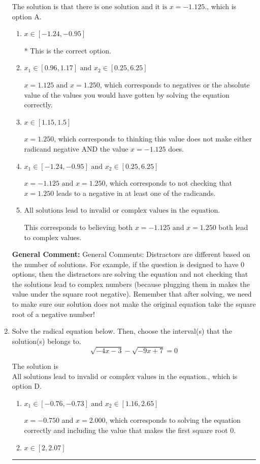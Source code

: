 \documentclass{extbook}[14pt]
\newcommand{\litem}[1]{\item #1

\rule{\textwidth}{0.4pt}}
\begin{document}
\begin{enumerate}
{The solution is \( \text{that there is one solution and it is } x = -1.125. \), which is option A.\begin{enumerate}[label=\Alph*.]
\item \( x \in [-1.24,-0.95] \)

* This is the correct option.
\item \( x_1 \in [0.96, 1.17] \text{ and } x_2 \in [0.25,6.25] \)

$x = 1.125 \text{ and } x = 1.250$, which corresponds to negatives or the absolute value of the values you would have gotten by solving the equation correctly.
\item \( x \in [1.15,1.5] \)

$x = 1.250$, which corresponds to thinking this value does not make either radicand negative AND the value $x = -1.125$ does.
\item \( x_1 \in [-1.24, -0.95] \text{ and } x_2 \in [0.25,6.25] \)

$x = -1.125 \text{ and } x = 1.250$, which corresponds to not checking that $x = 1.250$ leads to a negative in at least one of the radicands.
\item \( \text{All solutions lead to invalid or complex values in the equation.} \)

This corresponds to believing both $x = -1.125 \text{ and } x = 1.250$ both lead to complex values.
\end{enumerate}

\textbf{General Comment:} General Comments: Distractors are different based on the number of solutions. For example, if the question is designed to have 0 options, then the distractors are solving the equation and not checking that the solutions lead to complex numbers (because plugging them in makes the value under the square root negative). Remember that after solving, we need to make sure our solution does not make the original equation take the square root of a negative number!
}
\litem{
Solve the radical equation below. Then, choose the interval(s) that the solution(s) belongs to.
\[ \sqrt{-4 x - 3} - \sqrt{-9 x + 7} = 0 \]

The solution is \( \text{All solutions lead to invalid or complex values in the equation.} \), which is option D.\begin{enumerate}[label=\Alph*.]
\item \( x_1 \in [-0.76, -0.73] \text{ and } x_2 \in [1.16,2.65] \)

$x = -0.750$ and $x = 2.000$, which corresponds to solving the equation correctly and including the value that makes the first square root 0.
\item \( x \in [2,2.07] \)


\end{enumerate}}
\end{enumerate}
\end{document}
